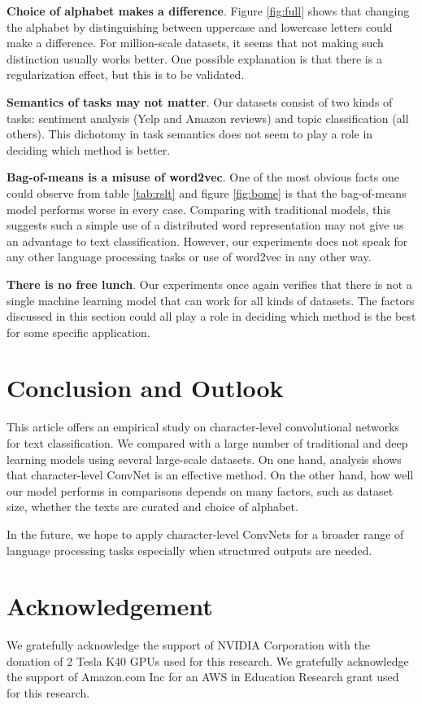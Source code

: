 \documentclass{article} \usepackage{nips15submit_e,times}
\newenvironment{centerverbatim}{\par
  \centering
  \varwidth{\linewidth}\verbatim
}{\endverbatim
  \endvarwidth
  \par
}
\begin{document}
\begin{centerverbatim}
\textbf{Choice of alphabet makes a difference}. Figure \ref{fig:full} shows that changing the alphabet by distinguishing between uppercase and lowercase letters could make a difference. For million-scale datasets, it seems that not making such distinction usually works better. One possible explanation is that there is a regularization effect, but this is to be validated.

\textbf{Semantics of tasks may not matter}. Our datasets consist of two kinds of tasks: sentiment analysis (Yelp and Amazon reviews) and topic classification (all others). This dichotomy in task semantics does not seem to play a role in deciding which method is better.

\textbf{Bag-of-means is a misuse of word2vec}\cite{LKW15}. One of the most obvious facts one could observe from table \ref{tab:rslt} and figure \ref{fig:bome} is that the bag-of-means model performs worse in every case. Comparing with traditional models, this suggests such a simple use of a distributed word representation may not give us an advantage to text classification. However, our experiments does not speak for any other language processing tasks or use of word2vec in any other way.

\textbf{There is no free lunch}. Our experiments once again verifies that there is not a single machine learning model that can work for all kinds of datasets. The factors discussed in this section could all play a role in deciding which method is the best for some specific application.

\section{Conclusion and Outlook}

This article offers an empirical study on character-level convolutional networks for text classification. We compared with a large number of traditional and deep learning models using several large-scale datasets. On one hand, analysis shows that character-level ConvNet is an effective method. On the other hand, how well our model performs in comparisons depends on many factors, such as dataset size, whether the texts are curated and choice of alphabet.

In the future, we hope to apply character-level ConvNets for a broader range of language processing tasks especially when structured outputs are needed.

\section*{Acknowledgement}

We gratefully acknowledge the support of NVIDIA Corporation with the donation of 2 Tesla K40 GPUs used for this research. We gratefully acknowledge the support of Amazon.com Inc for an AWS in Education Research grant used for this research.


\small
{}
\end{document}

